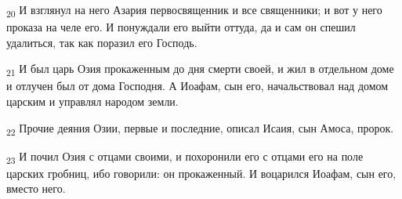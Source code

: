 \begin{tcolorbox}
\textsubscript{20} И взглянул на него Азария первосвященник и все священники; и вот у него проказа на челе его. И понуждали его выйти оттуда, да и сам он спешил удалиться, так как поразил его Господь.
\end{tcolorbox}
\begin{tcolorbox}
\textsubscript{21} И был царь Озия прокаженным до дня смерти своей, и жил в отдельном доме и отлучен был от дома Господня. А Иоафам, сын его, начальствовал над домом царским и управлял народом земли.
\end{tcolorbox}
\begin{tcolorbox}
\textsubscript{22} Прочие деяния Озии, первые и последние, описал Исаия, сын Амоса, пророк.
\end{tcolorbox}
\begin{tcolorbox}
\textsubscript{23} И почил Озия с отцами своими, и похоронили его с отцами его на поле царских гробниц, ибо говорили: он прокаженный. И воцарился Иоафам, сын его, вместо него.
\end{tcolorbox}
